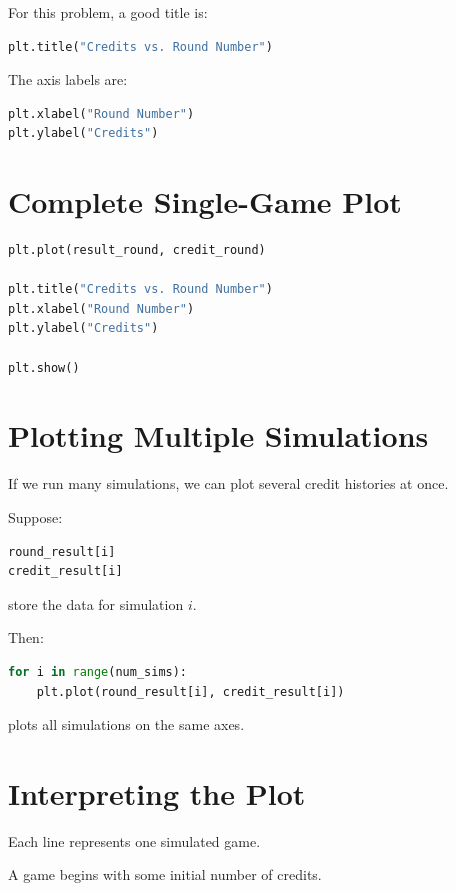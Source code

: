 \documentclass[11pt]{article}
\begin{document}
For this problem, a good title is:

\begin{lstlisting}[language=Python]
plt.title("Credits vs. Round Number")
\end{lstlisting}

The axis labels are:

\begin{lstlisting}[language=Python]
plt.xlabel("Round Number")
plt.ylabel("Credits")
\end{lstlisting}

\section{Complete Single-Game Plot}

\begin{lstlisting}[language=Python]
plt.plot(result_round, credit_round)

plt.title("Credits vs. Round Number")
plt.xlabel("Round Number")
plt.ylabel("Credits")

plt.show()
\end{lstlisting}

\section{Plotting Multiple Simulations}

If we run many simulations, we can plot several credit histories at once.

Suppose:

\begin{lstlisting}[language=Python]
round_result[i]
credit_result[i]
\end{lstlisting}

store the data for simulation \(i\).

Then:

\begin{lstlisting}[language=Python]
for i in range(num_sims):
    plt.plot(round_result[i], credit_result[i])
\end{lstlisting}

plots all simulations on the same axes.

\section{Interpreting the Plot}

Each line represents one simulated game.

A game begins with some initial number of credits.
\end{document}
